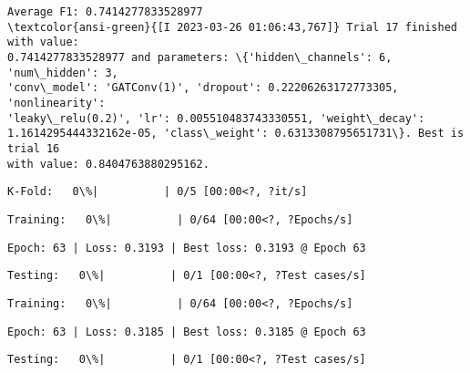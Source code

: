 \documentclass[11pt]{article}
\begin{document}
    
    \begin{Verbatim}[commandchars=\\\{\}]
Average F1: 0.7414277833528977
\textcolor{ansi-green}{[I 2023-03-26 01:06:43,767]} Trial 17 finished with value:
0.7414277833528977 and parameters: \{'hidden\_channels': 6, 'num\_hidden': 3,
'conv\_model': 'GATConv(1)', 'dropout': 0.22206263172773305, 'nonlinearity':
'leaky\_relu(0.2)', 'lr': 0.005510483743330551, 'weight\_decay':
1.1614295444332162e-05, 'class\_weight': 0.6313308795651731\}. Best is trial 16
with value: 0.8404763880295162.
    \end{Verbatim}

    
    \begin{Verbatim}[commandchars=\\\{\}]
K-Fold:   0\%|          | 0/5 [00:00<?, ?it/s]
    \end{Verbatim}

    
    
    \begin{Verbatim}[commandchars=\\\{\}]
Training:   0\%|          | 0/64 [00:00<?, ?Epochs/s]
    \end{Verbatim}

    
    \begin{Verbatim}[commandchars=\\\{\}]
Epoch: 63 | Loss: 0.3193 | Best loss: 0.3193 @ Epoch 63
    \end{Verbatim}

    
    \begin{Verbatim}[commandchars=\\\{\}]
Testing:   0\%|          | 0/1 [00:00<?, ?Test cases/s]
    \end{Verbatim}

    
    
    \begin{Verbatim}[commandchars=\\\{\}]
Training:   0\%|          | 0/64 [00:00<?, ?Epochs/s]
    \end{Verbatim}

    
    \begin{Verbatim}[commandchars=\\\{\}]
Epoch: 63 | Loss: 0.3185 | Best loss: 0.3185 @ Epoch 63
    \end{Verbatim}

    
    \begin{Verbatim}[commandchars=\\\{\}]
Testing:   0\%|          | 0/1 [00:00<?, ?Test cases/s]
    \end{Verbatim}
\end{document}
